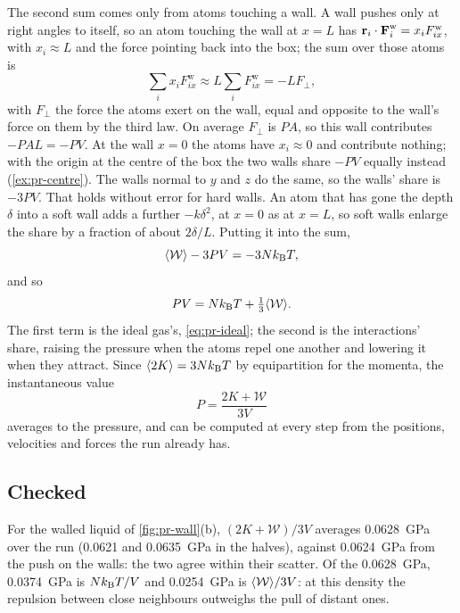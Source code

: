The second sum comes only from atoms touching a wall. A wall pushes only
at right angles to itself, so an atom touching the wall at $x = L$ has
$\bm{\mathrm{r}}_i\cdot\bm{\mathrm{F}}^{\mathrm w}_i = x_iF^{\mathrm w}_{ix}$, with $x_i
\approx L$ and the force pointing back into the box; the sum over those
atoms is
\begin{equation*}
   \sum_ix_iF^{\mathrm w}_{ix} \approx L\sum_iF^{\mathrm w}_{ix} =
   -LF_\perp ,
\end{equation*}
with $F_\perp$ the force the atoms exert on the wall, equal and opposite
to the wall's force on them by the third law. On average $F_\perp$ is
$PA$, so this wall contributes $-PAL = -PV$. At the wall $x = 0$ the
atoms have $x_i \approx 0$ and contribute nothing; with the origin at the
centre of the box the two walls share $-PV$ equally instead
(\cref{ex:pr-centre}). The walls normal to $y$ and $z$ do the same, so the
walls' share is $-3PV$. That holds without error for hard walls. An atom
that has gone the depth $\delta$ into a soft wall adds a further
$-k\delta^2$, at $x = 0$ as at $x = L$, so soft walls enlarge the share by
a fraction of about $2\delta/L$. Putting it into the sum,
\begin{equation*}
   \langle \mathcal{W} \rangle - 3PV = -3Nk_{\mathrm{B}} T ,
\end{equation*}
and so
\begin{equation}
   PV = Nk_{\mathrm{B}} T + \tfrac13\langle \mathcal{W} \rangle .
   \label{eq:pr-virial}
\end{equation}
The first term is the ideal gas's, \cref{eq:pr-ideal}; the second is the
interactions' share, raising the pressure when the atoms repel one
another and lowering it when they attract. Since $\langle 2K \rangle = 3Nk_{\mathrm{B}} T$ by
equipartition for the momenta, the instantaneous value
\begin{equation*}
   P = \frac{2K + \mathcal{W}}{3V}
\end{equation*}
averages to the pressure, and can be computed at every step from the
positions, velocities and forces the run already has.

\subsection*{Checked}

For the walled liquid of \cref{fig:pr-wall}(b), $(2K + \mathcal{W})/3V$
averages \SI{0.0628}{\giga\pascal} over the run (0.0621 and
\SI{0.0635}{\giga\pascal} in the halves), against \SI{0.0624}{\giga\pascal}
from the push on the walls: the two agree within their scatter. Of the
\SI{0.0628}{\giga\pascal}, \SI{0.0374}{\giga\pascal} is $Nk_{\mathrm{B}} T/V$ and
\SI{0.0254}{\giga\pascal} is $\langle \mathcal{W} \rangle/3V$: at this density the
repulsion between close neighbours outweighs the pull of distant ones.

